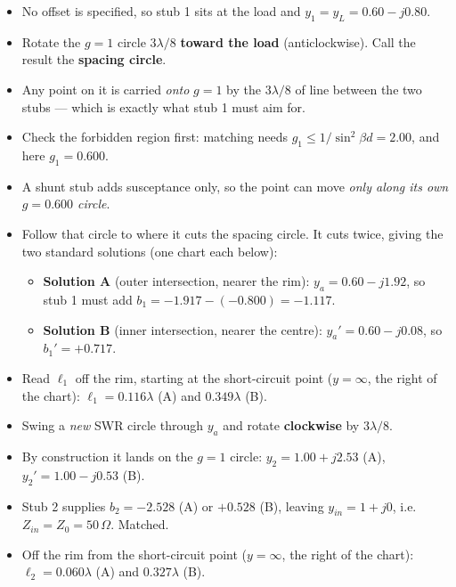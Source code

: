 \begin{itemize}
  \item No offset is specified, so stub 1 sits at the load and $y_1 = y_L = 0.60 - j0.80$.
\end{itemize}
\begin{itemize}
  \item Rotate the $g=1$ circle $3\lambda/8$ \textbf{toward the load} (anticlockwise). Call the result the \textbf{spacing circle}.
  \item Any point on it is carried \emph{onto} $g=1$ by the $3\lambda/8$ of line between the two stubs --- which is exactly what stub 1 must aim for.
  \item Check the forbidden region first: matching needs $g_1 \le 1/\sin^2\beta d = 2.00$, and here $g_1 = 0.600$. \checkmark
\end{itemize}
\begin{itemize}
  \item A shunt stub adds susceptance only, so the point can move \emph{only along its own $g = 0.600$ circle}.
  \item Follow that circle to where it cuts the spacing circle. It cuts twice, giving the two standard solutions (one chart each below):
  \begin{itemize}
    \item \textbf{Solution A} (outer intersection, nearer the rim): $y_a = 0.60 - j1.92$, so stub 1 must add $b_1 = -1.917 - (-0.800) = -1.117$.
    \item \textbf{Solution B} (inner intersection, nearer the centre): $y_a' = 0.60 - j0.08$, so $b_1' = +0.717$.
  \end{itemize}
  \item Read $\ell_1$ off the rim, starting at the short-circuit point ($y=\infty$, the right of the chart): $\ell_1 = 0.116\lambda$ (A) and $0.349\lambda$ (B).
\end{itemize}
\begin{itemize}
  \item Swing a \emph{new} SWR circle through $y_a$ and rotate \textbf{clockwise} by $3\lambda/8$.
  \item By construction it lands on the $g=1$ circle: $y_2 = 1.00 + j2.53$ (A), $y_2' = 1.00 - j0.53$ (B).
\end{itemize}
\begin{itemize}
  \item Stub 2 supplies $b_2 = -2.528$ (A) or $+0.528$ (B), leaving $y_{in} = 1 + j0$, i.e. $Z_{in} = Z_0 = 50\,\Omega$. Matched.
  \item Off the rim from the short-circuit point ($y=\infty$, the right of the chart): $\ell_2 = 0.060\lambda$ (A) and $0.327\lambda$ (B).
\end{itemize}
